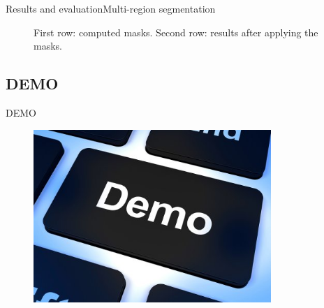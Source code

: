 \documentclass[10pt]{beamer}
\begin{document}
\begin{frame}{Results and evaluation}{Multi-region segmentation}
\begin{figure}[H]
  \qquad
  \qquad
  \caption{First row: computed masks. Second row: results after applying the masks.}
\end{figure}

\end{frame}
\subsection{DEMO}
\begin{frame}{DEMO}
\begin{figure}[H]
    \centering
    \includegraphics[width=9cm]{figures/demo.jpg}
\end{figure}
\end{frame} 
\end{document}
